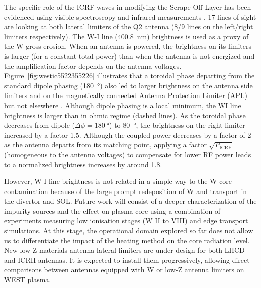 \documentclass[12p]{iopart}
\begin{document}
The specific role of the ICRF waves in modifying the Scrape-Off Layer has been evidenced using visible spectroscopy and infrared measurements \cite{colas2020, urbanczyk2019, urbanczyk2021}. 17 lines of sight are looking at both lateral limiters of the Q2 antenna (8/9 lines on the left/right limiters respectively). The W-I line (\SI{400.8}{\nano\meter}) brightness is used as a proxy of the W gross erosion. When an antenna is powered, the brightness on its limiters is larger (for a constant total power) than when the antenna is not energized and the amplification factor depends on the antenna voltages. Figure~\ref{fig:westic5522355226} illustrates that a toroidal phase departing from the standard dipole phasing (\SI{180}{\degree}) also led to larger brightness on the antenna side limiters and on the magnetically connected Antenna Protection Limiter (APL) but not elsewhere \cite{urbanczyk2019}. 
Although dipole phasing is a local minimum, the WI line brightness is larger than in ohmic regime (dashed lines). As the toroidal phase decreases from dipole ($\Delta\phi=\SI{180}{\degree}$) to \SI{80}{\degree}, the brightness on the right limiter increased by a factor 1.5. Although the coupled power decreases by a factor of 2 as the antenna departs from its matching point, applying a factor $\sqrt{P_{\mathrm{ICRF}}}$ (homogeneous to the antenna voltages) to compensate for lower RF power leads to a normalized brightness increases by around 1.8. 

However, W-I line brightness is not related in a simple way to the W core contamination because of the large prompt redeposition of W and transport in the divertor and SOL. Future work will consist of a deeper characterization of the impurity sources and the effect on plasma core using a combination of experiments measuring low ionisation stages (W II to VIII) and edge transport simulations. At this stage, the operational domain explored so far does not allow us to differentiate the impact of the heating method on the core radiation level. New low-Z materials antenna lateral limiters are under design for both LHCD and ICRH antennas. It is expected to install them progressively, allowing direct comparisons between antennas equipped with W or low-Z antenna limiters on WEST plasma.
\end{document}
